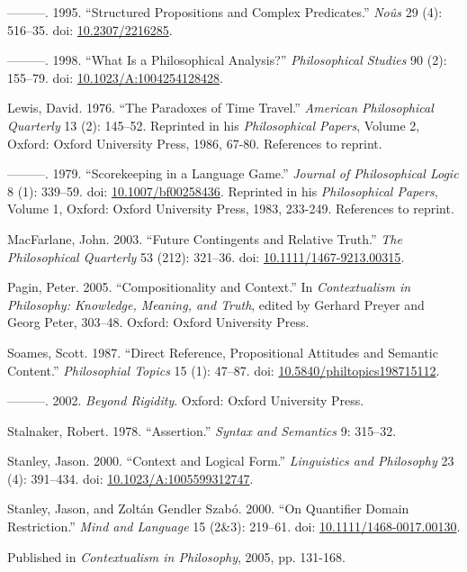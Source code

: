 \documentclass[
  11pt,
  letterpaper,
  DIV=11,
  numbers=noendperiod,
  twoside]{scrartcl}
\newlength{\cslhangindent}
\newenvironment{CSLReferences}[2] %
 {\begin{list}{}{%
  \setlength{\itemindent}{0pt}
  \setlength{\leftmargin}{0pt}
  \setlength{\parsep}{0pt}
  \ifodd #1
   \setlength{\leftmargin}{\cslhangindent}
   \setlength{\itemindent}{-1\cslhangindent}
  \fi
  \setlength{\itemsep}{#2\baselineskip}}}
 {\end{list}}
\begin{document}
\begin{CSLReferences}{1}{0}
---------. 1995. {``Structured Propositions and Complex Predicates.''}
\emph{No{û}s} 29 (4): 516--35. doi:
\href{https://doi.org/10.2307/2216285}{10.2307/2216285}.

---------. 1998. {``What Is a Philosophical Analysis?''}
\emph{Philosophical Studies} 90 (2): 155--79. doi:
\href{https://doi.org/10.1023/A:1004254128428}{10.1023/A:1004254128428}.

Lewis, David. 1976. {``The Paradoxes of Time Travel.''} \emph{American
Philosophical Quarterly} 13 (2): 145--52. Reprinted in his
\emph{Philosophical Papers}, Volume 2, Oxford: Oxford University Press,
1986, 67-80. References to reprint.

---------. 1979. {``Scorekeeping in a Language Game.''} \emph{Journal of
Philosophical Logic} 8 (1): 339--59. doi:
\href{https://doi.org/10.1007/bf00258436}{10.1007/bf00258436}. Reprinted
in his \emph{Philosophical Papers}, Volume 1, Oxford: Oxford University
Press, 1983, 233-249. References to reprint.

MacFarlane, John. 2003. {``{Future Contingents and Relative Truth}.''}
\emph{The Philosophical Quarterly} 53 (212): 321--36. doi:
\href{https://doi.org/10.1111/1467-9213.00315}{10.1111/1467-9213.00315}.

Pagin, Peter. 2005. {``Compositionality and Context.''} In
\emph{Contextualism in Philosophy: Knowledge, Meaning, and Truth},
edited by Gerhard Preyer and Georg Peter, 303--48. Oxford: Oxford
University Press.

Soames, Scott. 1987. {``Direct Reference, Propositional Attitudes and
Semantic Content.''} \emph{Philosophial Topics} 15 (1): 47--87. doi:
\href{https://doi.org/10.5840/philtopics198715112}{10.5840/philtopics198715112}.

---------. 2002. \emph{Beyond Rigidity}. Oxford: Oxford University
Press.

Stalnaker, Robert. 1978. {``Assertion.''} \emph{Syntax and Semantics} 9:
315--32.

Stanley, Jason. 2000. {``{Context and Logical Form}.''}
\emph{Linguistics and Philosophy} 23 (4): 391--434. doi:
\href{https://doi.org/10.1023/A:1005599312747}{10.1023/A:1005599312747}.

Stanley, Jason, and Zoltán Gendler Szabó. 2000. {``{On Quantifier Domain
Restriction}.''} \emph{Mind and Language} 15 (2\&3): 219--61. doi:
\href{https://doi.org/10.1111/1468-0017.00130}{10.1111/1468-0017.00130}.

\end{CSLReferences}



\noindent Published in\emph{
Contextualism in Philosophy}, 2005, pp. 131-168.
\end{document}
